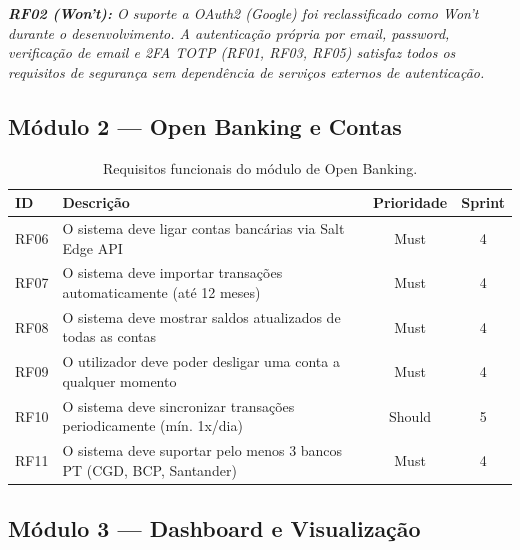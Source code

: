 \noindent\small\textit{\textbf{RF02 (Won't):} O suporte a OAuth2 (Google) foi reclassificado como \textit{Won't} durante o desenvolvimento. A autenticação própria por email, password, verificação de email e 2FA TOTP (RF01, RF03, RF05) satisfaz todos os requisitos de segurança sem dependência de serviços externos de autenticação.}

\subsection{Módulo 2 --- Open Banking e Contas}

\begin{table}[H]
\centering
\caption{Requisitos funcionais do módulo de Open Banking.}
\label{tab:rf-openbanking}
\small
\begin{tabularx}{\textwidth}{l X c c}
\toprule
\textbf{ID} & \textbf{Descrição} & \textbf{Prioridade} & \textbf{Sprint} \\
\midrule
RF06 & O sistema deve ligar contas bancárias via Salt Edge \ac{API} & Must & 4 \\
RF07 & O sistema deve importar transações automaticamente (até 12 meses) & Must & 4 \\
RF08 & O sistema deve mostrar saldos atualizados de todas as contas & Must & 4 \\
RF09 & O utilizador deve poder desligar uma conta a qualquer momento & Must & 4 \\
RF10 & O sistema deve sincronizar transações periodicamente (mín. 1x/dia) & Should & 5 \\
RF11 & O sistema deve suportar pelo menos 3 bancos PT (CGD, BCP, Santander) & Must & 4 \\
\bottomrule
\end{tabularx}
\end{table}

\subsection{Módulo 3 --- Dashboard e Visualização}

